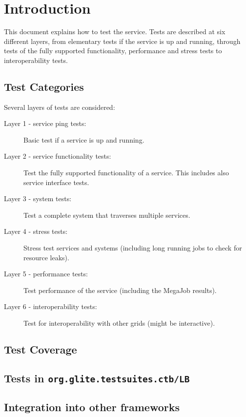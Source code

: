 \section{Introduction}



This document explains how to test the \LB service. Tests are described at six different layers, from elementary tests
if the service is up and running, through tests of the fully supported functionality,
performance and stress tests to interoperability tests.



\subsection{Test Categories}
Several layers of tests are considered:

\begin{description}
\item[Layer 1 - service ping tests:] Basic test if a service is up and running.
\item[Layer 2 - service functionality tests:] Test the fully supported functionality of a service. This includes also service interface tests.
\item[Layer 3 - system tests:] Test a complete system that traverses multiple services.
\item[Layer 4 - stress tests:] Stress test services and systems (including long running jobs to check for resource leaks).
\item[Layer 5 - performance tests:] Test performance of the service (including the MegaJob results).
\item[Layer 6 - interoperability tests:] Test for interoperability with other grids (might be interactive).
\end{description}


\subsection{Test Coverage}


\subsection{Tests in \texttt{org.glite.testsuites.ctb/LB}}


\subsection{Integration into other frameworks}
